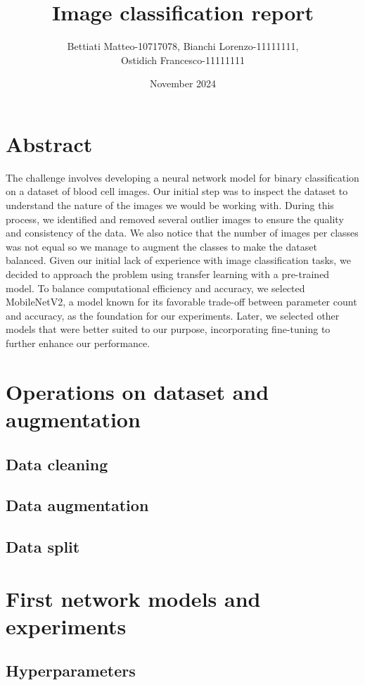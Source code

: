 \documentclass{article}
\title{\textbf{Image classification report}}
\author{Bettiati Matteo-10717078, Bianchi Lorenzo-11111111,\\ Ostidich Francesco-11111111}
\date{November 2024}
\begin{document}
\maketitle

\section{Abstract}
The challenge involves developing a neural network model for binary classification on a dataset of blood cell images. Our initial step was to inspect the dataset to understand the nature of the images we would be working with. During this process, we identified and removed several outlier images to ensure the quality and consistency of the data. We also notice that the number of images per classes was not equal so we manage to augment the classes to make the dataset balanced. Given our initial lack of experience with image classification tasks, we decided to approach the problem using transfer learning with a pre-trained model. To balance computational efficiency and accuracy, we selected MobileNetV2, a model known for its favorable trade-off between parameter count and accuracy, as the foundation for our experiments. Later, we selected other models that were better suited to our purpose, incorporating fine-tuning to further enhance our performance.

\section{Operations on dataset and augmentation}
\subsection{Data cleaning}
\subsection{Data augmentation}
\subsection{Data split}

\section{First network models and experiments}
\subsection{Hyperparameters}
\end{document}

